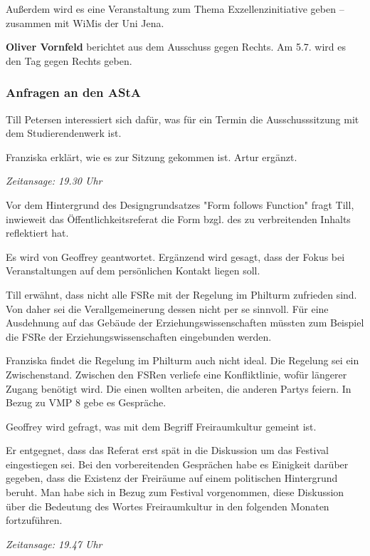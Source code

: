 \documentclass[ngerman,headheight=70pt]{scrartcl}
\begin{document}
    Außerdem wird es eine Veranstaltung zum Thema Exzellenzinitiative geben --
    zusammen mit WiMis der Uni Jena.

    \textbf{Oliver Vornfeld} berichtet aus dem Ausschuss gegen Rechts. Am 5.7.
    wird es den Tag gegen Rechts geben.

    \subsubsection{Anfragen an den AStA}

    Till Petersen interessiert sich dafür, was für ein Termin die Ausschusssitzung
    mit dem Studierendenwerk ist.

    Franziska erklärt, wie es zur Sitzung gekommen ist. Artur ergänzt.

    \textit{Zeitansage: 19.30 Uhr}

    Vor dem Hintergrund des Designgrundsatzes "Form follows Function" fragt Till,
    inwieweit das Öffentlichkeitsreferat die Form bzgl. des zu verbreitenden
    Inhalts reflektiert hat.

    Es wird von Geoffrey geantwortet. Ergänzend wird gesagt, dass der Fokus
    bei Veranstaltungen auf dem persönlichen Kontakt liegen soll.

    Till erwähnt, dass nicht alle FSRe mit der Regelung im Philturm zufrieden
    sind. Von daher sei die Verallgemeinerung dessen nicht per se sinnvoll. Für
    eine Ausdehnung auf das Gebäude der Erziehungswissenschaften müssten zum
    Beispiel die FSRe der Erziehungswissenschaften eingebunden werden.

    Franziska findet die Regelung im Philturm auch nicht ideal. Die Regelung sei
    ein Zwischenstand. Zwischen den FSRen verliefe eine Konfliktlinie, wofür längerer
    Zugang benötigt wird. Die einen wollten arbeiten, die anderen Partys feiern.
    In Bezug zu VMP 8 gebe es Gespräche.

    Geoffrey wird gefragt, was mit dem Begriff Freiraumkultur gemeint ist.

    Er entgegnet, dass das Referat erst spät in die Diskussion um das Festival
    eingestiegen sei. Bei den vorbereitenden Gesprächen habe es Einigkeit darüber
    gegeben, dass die Existenz der Freiräume auf einem politischen Hintergrund beruht.
    Man habe sich in Bezug zum Festival vorgenommen, diese Diskussion über die
    Bedeutung des Wortes Freiraumkultur in den folgenden Monaten fortzuführen.

    \textit{Zeitansage: 19.47 Uhr}
\end{document}
